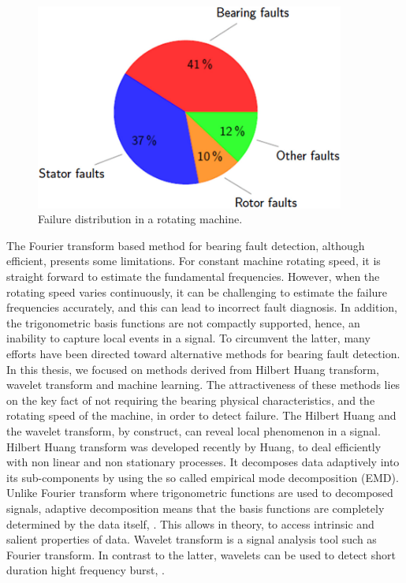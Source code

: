 \documentclass[../Main/thesis.tex]{subfiles}
\begin{document}
\begin{figure}[H] %
   \centering
   \includegraphics[width=4in]{../fig/pie.png} 
   \caption{Failure distribution in a rotating machine. }
   \label{fig:pie}
\end{figure}
\justify
The Fourier transform based method for bearing fault detection, although efficient, presents some limitations.
 For constant machine rotating speed, it is straight forward to estimate the fundamental frequencies. However, when the rotating speed varies continuously, it can be challenging to estimate the failure frequencies accurately, and this can lead to incorrect fault diagnosis. In addition, the trigonometric basis functions are not compactly supported, hence, an inability to capture local events in a signal.
\justify
To circumvent the latter, many efforts have been directed toward alternative methods for bearing fault detection. In this thesis, we focused on methods derived from Hilbert Huang transform, wavelet transform and machine learning. The attractiveness of these methods lies on the key fact of not requiring the bearing physical characteristics, and the rotating speed of the machine, in order to detect failure. The Hilbert Huang and the wavelet transform, by construct, can reveal local phenomenon in a signal.
\justify
Hilbert Huang transform was developed recently by  Huang, \cite{huang98} to deal efficiently with non linear and non stationary processes. It decomposes data adaptively 
into its sub-components by using the so called empirical mode decomposition (EMD). Unlike Fourier transform where trigonometric functions are used to decomposed signals, adaptive decomposition means that 
the basis functions are completely determined by the data itself, \cite{huang08}. This allows in theory, to access intrinsic and salient properties of data.
\justify
Wavelet transform is a signal analysis tool such as Fourier transform. In contrast to the latter, wavelets can be used to detect short duration hight frequency burst, \cite{albert09}.
\end{document}
